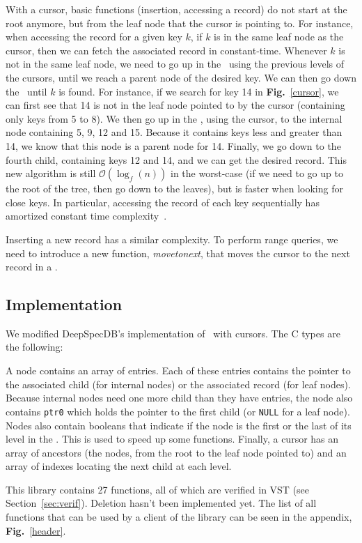 \cursor

With a cursor, basic functions (insertion, accessing a record) do not start at the root anymore, but from the leaf node that the cursor is pointing to.
For instance, when accessing the record for a given key $k$, if $k$ is in the same leaf node as the cursor, then we can fetch the associated record in constant-time.
Whenever $k$ is not in the same leaf node, we need to go up in the \btree\ using the previous levels of the cursors, until we reach a parent node of the desired key.
We can then go down the \btree\ until $k$ is found.
For instance, if we search for key 14 in \textbf{Fig.}~\ref{cursor}, we can first see that 14 is not in the leaf node pointed to by the cursor (containing only keys from 5 to 8).
We then go up in the \btree, using the cursor, to the internal node containing 5, 9, 12 and 15.
Because it contains keys less and greater than 14, we know that this node is a parent node for 14.
Finally, we go down to the fourth child, containing keys 12 and 14, and we can get the desired record.
This new algorithm is still $\mathcal{O}(\log_{f}(n))$ in the worst-case (if we need to go up to the root of the tree, then go down to the leaves),
but is faster when looking for close keys.
In particular, accessing the record of each key sequentially has amortized constant time complexity~\cite{tosin}.

Inserting a new record has a similar complexity.
To perform range queries, we need to introduce a new function, \textit{movetonext}, that moves the cursor to the next record in a \btree.

\subsection{Implementation}
We modified DeepSpecDB's implementation of \btrees\ with cursors. The C types are the following:

\begin{multicols}{2}

\end{multicols}

A node contains an array of entries.
Each of these entries contains the pointer to the associated child (for internal nodes) or the associated record (for leaf nodes).
Because internal nodes need one more child than they have entries, the node also contains \texttt{ptr0} which holds the pointer to the first child (or \texttt{NULL} for a leaf node).
Nodes also contain booleans that indicate if the node is the first or the last of its level in the \btree.
This is used to speed up some functions.
Finally, a cursor has an array of ancestors (the nodes, from the root to the leaf node pointed to) and an array of indexes locating the next child at each level.

This library contains 27 functions, all of which are verified in VST (see Section~\ref{sec:verif}).
Deletion hasn't been implemented yet.
The list of all functions that can be used by a client of the library can be seen in the appendix, \textbf{Fig.}~\ref{header}.


